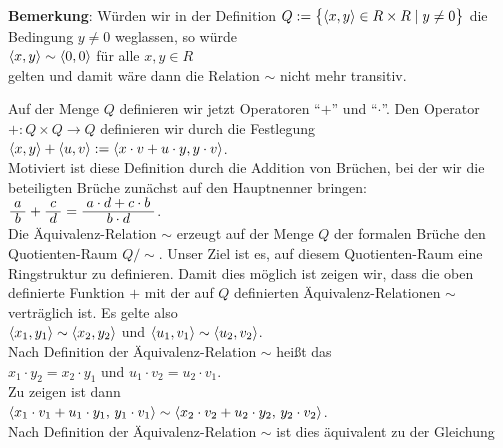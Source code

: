 \begin{enumerate}
      \textbf{Bemerkung}: Würden wir in der Definition 
      $Q := \bigl\{ \pair(x, y) \in R \times R \mid y \not= 0 \bigr\}$
      die Bedingung $y \not= 0$ weglassen, so würde 
      \\[0.2cm]
      \hspace*{1.3cm}
      $\pair(x, y) \sim \pair(0, 0)$ \quad für alle $x,y \in R$
      \\[0.2cm]
      gelten und damit wäre dann die Relation $\sim$ nicht mehr transitiv.
\end{enumerate}
Auf der Menge $Q$ definieren wir jetzt Operatoren ``$+$'' und ``$\cdot$''.
Den Operator $+: Q \times Q \rightarrow Q$  definieren wir durch die Festlegung
\\[0.2cm]
\hspace*{1.3cm}
$\pair(x,y) + \pair(u,v) := \pair(x \cdot v + u \cdot y, y \cdot v)$.
\\[0.2cm]
Motiviert ist diese Definition durch die Addition von Brüchen, bei der wir die beteiligten Brüche
zunächst auf den Hauptnenner bringen:
\\[0.2cm]
\hspace*{1.3cm}
$\bruch{a}{b} + \bruch{c}{d} = \bruch{a \cdot d + c \cdot b}{b \cdot d}$.
\\[0.2cm]
Die Äquivalenz-Relation $\sim$ erzeugt auf der Menge $Q$ der formalen Brüche den Quotienten-Raum
$Q/\!\sim$.
Unser Ziel ist es, auf diesem Quotienten-Raum 
eine Ringstruktur zu definieren.  Damit dies möglich ist zeigen wir, dass die oben definierte
Funktion $+$ mit der auf $Q$ definierten Äquivalenz-Relationen $\sim$ 
verträglich ist.  Es gelte also
\\[0.2cm]
\hspace*{1.3cm}
$\pair(x_1,y_1) \sim \pair(x_2,y_2)$ \quad und \quad
$\pair(u_1,v_1) \sim \pair(u_2,v_2)$.
\\[0.2cm]
Nach Definition der Äquivalenz-Relation $\sim$ heißt das
\\[0.2cm]
\hspace*{1.3cm}
$x_1 \cdot y_2 = x_2 \cdot y_1$ \quad und \quad
$u_1 \cdot v_2 = u_2 \cdot v_1$.
\\[0.2cm]
Zu zeigen ist dann
\\[0.2cm]
\hspace*{1.3cm}
$\pair(x_1 \cdot v_1 + u_1 \cdot y_1,\, y_1 \cdot v_1) \sim 
 \pair(x_2 \cdot v_2 + u_2 \cdot y_2,\, y_2 \cdot v_2)$.
\\[0.2cm]
Nach Definition der Äquivalenz-Relation $\sim$ ist dies äquivalent zu der Gleichung
\\[0.2cm]
